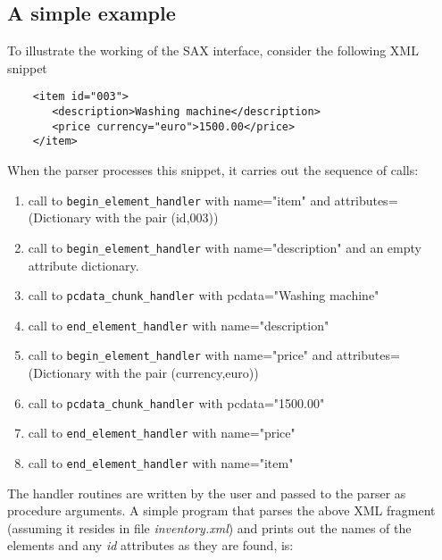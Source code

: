\documentclass[11pt]{article}
\begin{document}
\subsection{A simple example}

To illustrate the working of the SAX interface, consider the following
XML snippet

\begin{verbatim}
	<item id="003">                                                
	   <description>Washing machine</description>  
	   <price currency="euro">1500.00</price>  
	</item>                                                            
\end{verbatim}
%
When the parser processes this snippet, it carries out the sequence of calls:

\begin{enumerate}
\item call to \texttt{begin\_element\_handler} with name="item" and 
    attributes=(Dictionary with the pair (id,003))
\item call to \texttt{begin\_element\_handler} with name="description" and an
    empty attribute dictionary. 
\item  call to \texttt{pcdata\_chunk\_handler} with pcdata="Washing machine"
\item call to \texttt{end\_element\_handler} with name="description"
\item call to \texttt{begin\_element\_handler} with name="price" and 
    attributes=(Dictionary with the pair (currency,euro))
\item  call to \texttt{pcdata\_chunk\_handler} with pcdata="1500.00"
\item call to \texttt{end\_element\_handler} with name="price"
\item call to \texttt{end\_element\_handler} with name="item"
\end{enumerate}
	
The handler routines are written by the user and passed to the parser
as procedure arguments. A simple program that parses the above XML
fragment (assuming it resides in file \textsl{inventory.xml}) and
prints out the names of the elements and any \textsl{id} attributes as
they are found, is:
\end{document}
